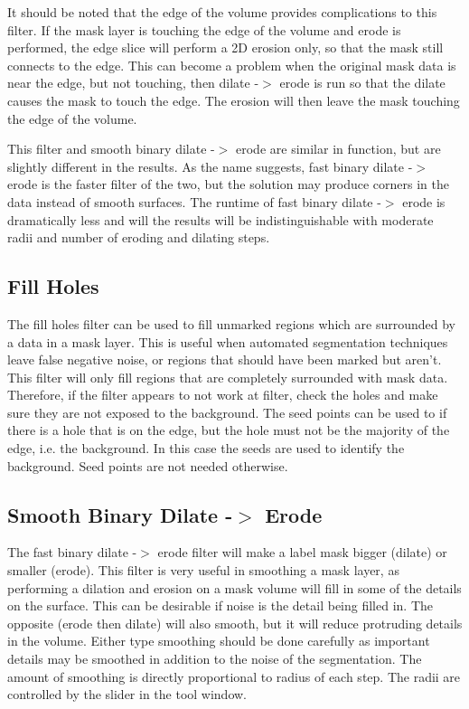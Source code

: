 \documentclass[fleqn,11pt,openany]{book}
\begin{document}
It should be noted that the edge of the volume provides complications to this filter.  If the mask layer is touching the edge of the volume and erode is performed, the edge slice will perform a 2D erosion only, so that the mask still connects to the edge.  This can  become a problem when the original mask data is near the edge, but not touching, then dilate -$>$ erode is run so that the dilate causes the mask to touch the edge.  The erosion will then leave the mask touching the edge of the volume.

This filter and smooth binary dilate -$>$ erode are similar in function, but are slightly different in the results.  As the name suggests, fast binary dilate -$>$ erode is the faster filter of the two, but the solution may produce corners in the data instead of smooth surfaces.  The runtime of fast binary dilate -$>$ erode is dramatically less and will the results will be indistinguishable with moderate radii and number of eroding and dilating steps.  


\subsection{Fill Holes}

The fill holes filter can be used to fill unmarked regions which are surrounded by a data in a mask layer.  This is useful when automated segmentation techniques leave false negative noise, or regions that should have been marked but aren't.  This filter will  only fill regions that are completely surrounded with mask data.  Therefore, if the filter appears to not work at filter, check the holes and make sure they are not exposed to the background.  The seed points can be used to if there is a hole that is on the edge, but the hole must not be the majority of the edge, i.e. the background.  In this case the seeds are used to identify the background.  Seed points are not needed otherwise.  


\subsection{Smooth Binary Dilate -$>$ Erode}

The fast binary dilate -$>$ erode filter will make a label mask bigger (dilate) or smaller (erode).  This filter is very useful in smoothing a mask layer, as performing a dilation and erosion on a mask volume will fill in some of the details on the surface.  This can be desirable if noise is the detail being filled in.  The opposite (erode then dilate) will also smooth, but it will reduce protruding details in the volume.  Either type smoothing should be done carefully as important details may be smoothed in addition to the noise of the segmentation. The amount of smoothing is directly proportional to radius of each step.  The radii are controlled by the slider in the tool window.  
\end{document}
